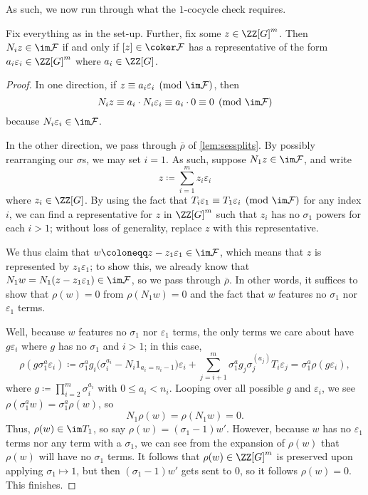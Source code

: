 \documentclass{article}
\numberwithin{equation}{section}
\begin{document}
As such, we now run through what the $1$-cocycle check requires.
\begin{lemma} \label{lem:cocycleforcecoord}
	Fix everything as in the set-up. Further, fix some $z\in\ZZ[G]^m$. Then $N_iz\in\im\mathcal F$ if and only if $[z]\in\coker\mathcal F$ has a representative of the form $a_i\varepsilon_i\in\ZZ[G]^m$ where $a_i\in\ZZ[G]$.
\end{lemma}
\begin{proof}
	In one direction, if $z\equiv a_i\varepsilon_i\pmod{\im\mathcal F}$, then
	\[N_iz\equiv a_i\cdot N_i\varepsilon_i\equiv a_i\cdot0\equiv0\pmod{\im\mathcal F}\]
	because $N_i\varepsilon_i\in\im\mathcal F$.

	In the other direction, we pass through $\overline\rho$ of \autoref{lem:sessplits}. By possibly rearranging our $\sigma$s, we may set $i=1$. As such, suppose $N_1z\in\im\mathcal F$, and write
	\[z\coloneqq\sum_{i=1}^mz_i\varepsilon_i\]
	where $z_i\in\ZZ[G]$. By using the fact that $T_i\varepsilon_1\equiv T_1\varepsilon_i\pmod{\im\mathcal F}$ for any index $i$, we can find a representative for $z$ in $\ZZ[G]^m$ such that $z_i$ has no $\sigma_1$ powers for each $i>1$; without loss of generality, replace $z$ with this representative.
	
	We thus claim that $w\coloneqq z-z_1\varepsilon_1\in\im\mathcal F$, which means that $z$ is represented by $z_1\varepsilon_1$; to show this, we already know that $N_1w=N_1(z-z_1\varepsilon_1)\in\im\mathcal F$, so we pass through $\overline\rho$. In other words, it suffices to show that $\rho(w)=0$ from $\rho(N_1w)=0$ and the fact that $w$ features no $\sigma_1$ nor $\varepsilon_1$ terms.
	
	Well, because $w$ features no $\sigma_1$ nor $\varepsilon_1$ terms, the only terms we care about have $g\varepsilon_i$ where $g$ has no $\sigma_1$ and $i>1$; in this case,
	\[\rho\left(g\sigma_1^a\varepsilon_i\right)\coloneqq\sigma_1^ag_i\big(\sigma_i^{a_i}-N_i1_{a_i=n_i-1}\big)\varepsilon_i+\sum_{j=i+1}^m\sigma_1^ag_j\sigma_j^{(a_j)}T_i\varepsilon_j=\sigma_1^a\rho(g\varepsilon_i),\]
	where $g\coloneqq\prod_{i=2}^m\sigma_i^{a_i}$ with $0\le a_i<n_i$. Looping over all possible $g$ and $\varepsilon_i$, we see $\rho(\sigma_1^aw)=\sigma_1^a\rho(w)$, so
	\[N_1\rho(w)=\rho(N_1w)=0.\]
	Thus, $\rho(w)\in\im T_1$, so say $\rho(w)=(\sigma_1-1)w'$. However, because $w$ has no $\varepsilon_1$ terms nor any term with a $\sigma_1$, we can see from the expansion of $\rho(w)$ that $\rho(w)$ will have no $\sigma_1$ terms. It follows that $\rho(w)\in\ZZ[G]^m$ is preserved upon applying $\sigma_1\mapsto1$, but then $(\sigma_1-1)w'$ gets sent to $0$, so it follows $\rho(w)=0$. This finishes.
\end{proof}
\end{document}
